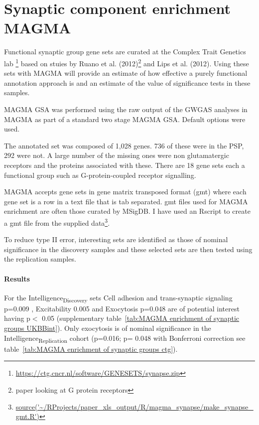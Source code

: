 \clearpage
\section{Synaptic component enrichment MAGMA}
\label{sec:Synaptic component enrichment MAGMA}

Functional synaptic group gene sets are curated  at the Complex Trait Genetics lab \footnote{\url{https://ctg.cncr.nl/software/GENESETS/synapse.zip}} based on stuies by Ruano et al. (2012)\cite{ruano2010functional}\footnote{paper looking at G protein receptors} and Lips et al. (2012)\cite{lips2012functional}. Using these sets with MAGMA will provide an estimate of how effective a purely functional annotation approach is and an estimate of the value of significance tests in these samples. 

MAGMA GSA was performed using the raw output of the GWGAS analyses in MAGMA as part of a standard two stage MAGMA GSA. Default options were used.

The annotated set was composed of 1,028 genes. 736 of these were in the PSP, 292 were not. A large number of the missing ones were non glutamatergic receptors and the  proteins associated with these. There are 18 gene sets each a functional group such as G-protein-coupled receptor signalling.

MAGMA accepts gene sets in gene matrix transposed format (gmt) where each gene set is a row in a text file that is tab separated. gmt files used for MAGMA enrichment are often those curated by MSigDB. I have used an Rscript to create a gmt file from the supplied data\footnote{\url{source('~/RProjects/paper_xls_output/R/magma_synapse/make_synapse_gmt.R')}}.

To reduce type II error, interesting sets are identified as those of nominal significance in the discovery samples and these selected sets are then tested using the replication samples. 

\paragraph{Results} For the Intelligence\textsubscript{Discovery} sets Cell adhesion and trans-synaptic signaling p=0.009 , Excitability 0.005 and Exocytosis p=0.048 are of potential interest having p$<$ 0.05 (supplementary table~\ref{tab:MAGMA enrichment of synaptic groups UKBBint}). Only exocytosis is of nominal significance in the Intelligence\textsubscript{Replication} cohort (p=0.016; p= 0.048 with Bonferroni correction see  table~\ref{tab:MAGMA enrichment of synaptic groups ctg}). 

